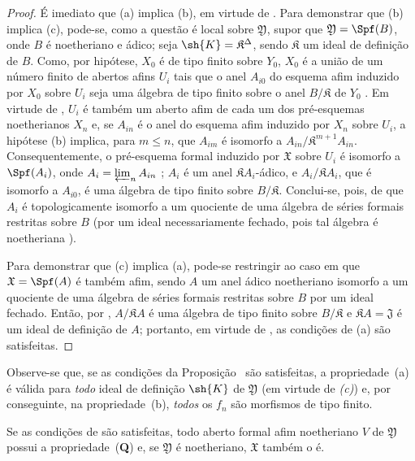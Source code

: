 \documentclass[oneside]{amsart}
\renewcommand{\leq}{\leqslant}
\let\EGAOriginalLabel\label
\renewcommand{\label}[1]{\phantomsection\EGAOriginalLabel{#1}}
\begin{document}
\begin{proof}
É imediato que (a) implica (b), em virtude de .
Para demonstrar que (b) implica (c), pode-se, como a questão é local sobre $\mathfrak{Y}$, supor que $\mathfrak{Y}=\Spf(B)$, onde $B$ é noetheriano e ádico;
seja $\sh{K}=\mathfrak{K}^\Delta$, sendo $\mathfrak{K}$ um ideal de definição de $B$.
Como, por hipótese, $X_0$ é de tipo finito sobre $Y_0$, $X_0$ é a união de um número finito de abertos afins $U_i$ tais que o anel $A_{i0}$ do esquema afim induzido por $X_0$ sobre $U_i$ seja uma álgebra de tipo finito sobre o anel $B/\mathfrak{K}$ de $Y_0$ .
Em virtude de , $U_i$ é também um aberto afim de cada um dos pré-esquemas noetherianos $X_n$ e, se $A_{in}$ é o anel do esquema afim induzido por $X_n$ sobre $U_i$, a hipótese (b) implica, para $m\leq n$, que $A_{im}$ é isomorfo a $A_{in}/\mathfrak{K}^{m+1}A_{in}$.
Consequentemente, o pré-esquema formal induzido por $\mathfrak{X}$ sobre $U_i$ é isomorfo a $\Spf(A_i)$, onde $A_i=\varprojlim_n A_{in}$ ;
$A_i$ é um anel $\mathfrak{K}A_i$-ádico, e $A_i/\mathfrak{K}A_i$, que é isomorfo a $A_{i0}$, é uma álgebra de tipo finito sobre $B/\mathfrak{K}$.
Conclui-se, pois, de  que $A_i$ é topologicamente isomorfo a um quociente de uma álgebra de séries formais restritas sobre $B$ (por um ideal necessariamente fechado, pois tal álgebra é noetheriana ).

Para demonstrar que (c) implica (a), pode-se restringir ao caso em que $\mathfrak{X}=\Spf(A)$ é também afim, sendo $A$ um anel ádico noetheriano isomorfo a um quociente de uma álgebra de séries formais restritas sobre $B$ por um ideal fechado.
Então, por , $A/\mathfrak{K}A$ é uma álgebra de tipo finito sobre $B/\mathfrak{K}$ e $\mathfrak{K}A=\mathfrak{J}$ é um ideal de definição de $A$; portanto, em virtude de , as condições de (a) são satisfeitas.
\end{proof}

Observe-se que, se as condições da Proposição~ são satisfeitas, a propriedade~(a) é válida para \emph{todo} ideal de definição $\sh{K}$ de $\mathfrak{Y}$ (em virtude de \emph{(c)}) e, por conseguinte, na propriedade~(b), \emph{todos} os $f_n$ são morfismos de tipo finito.

\begin{corollary}[10.13.2]
\label{I.10.13.2}
Se as condições de  são satisfeitas, todo aberto formal afim noetheriano $V$ de $\mathfrak{Y}$ possui a propriedade~(\textbf{Q}) e, se $\mathfrak{Y}$ é noetheriano, $\mathfrak{X}$ também o é.
\end{corollary}
\end{document}

